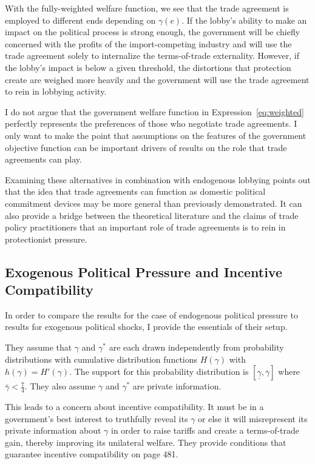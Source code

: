\documentclass[12pt]{article}
\newcommand{\ov}{\overline}
\newcommand{\un}{\underline}
\newcommand{\ga}{\gamma}
\begin{document}
With the fully-weighted welfare function, we see that the trade agreement is employed to different ends depending on $\ga(e)$. If the lobby's ability to make an impact on the political process is strong enough, the government will be chiefly concerned with the profits of the import-competing industry and will use the trade agreement solely to internalize the terms-of-trade externality. However, if the lobby's impact is below a given threshold, the distortions that protection create are weighed more heavily and the government will use the trade agreement to rein in lobbying activity.


I do not argue that the government welfare function in Expression~\ref{eq:weighted} perfectly represents the preferences of those who negotiate trade agreements. I only want to make the point that assumptions on the features of the government objective function can be important drivers of results on the role that trade agreements can play. 

Examining these alternatives in combination with endogenous lobbying points out that the idea that trade agreements can function as domestic political commitment devices may be more general than previously demonstrated. It can also provide a bridge between the theoretical literature and the claims of trade policy practitioners that an important role of trade agreements is to rein in protectionist pressure.

\subsection{Exogenous Political Pressure and Incentive Compatibility}
In order to compare the results for the case of endogenous political pressure to \Textcite{bs2005} results for exogenous political shocks, I provide the essentials of their setup. 

They assume that $\ga$ and $\ga^*$ are each drawn independently from probability distributions with cumulative distribution functions $H(\ga)$ with $h(\ga)=H'(\ga)$. The support for this probability distribution is $\left[\un{\ga}, \ov{\ga} \right]$ where $\ov{\ga} < \frac{7}{4}$. They also assume $\ga$ and $\ga^*$ are private information.

This leads to a concern about incentive compatibility. It must be in a government's best interest to truthfully reveal its $\ga$ or else it will misrepresent its private information about $\ga$ in order to raise tariffs and create a terms-of-trade gain, thereby improving its unilateral welfare. They provide conditions that guarantee incentive compatibility on page 481.
\end{document}
